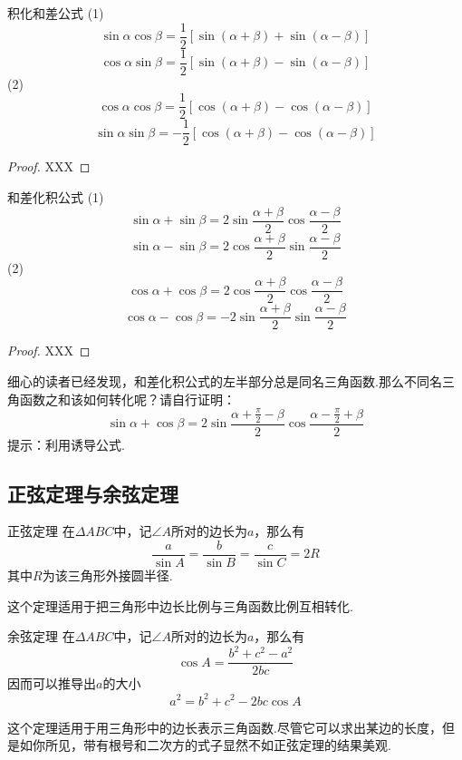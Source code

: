 \documentclass[lang=cn, zihao=5]{elegantbook}
\begin{document}
\begin{proposition}{积化和差公式} %
    (1)$$\sin{\alpha}\cos{\beta}=\frac{1}{2}[\sin{(\alpha+\beta)}+\sin{(\alpha-\beta)}]$$
    $$\cos{\alpha}\sin{\beta}=\frac{1}{2}[\sin{(\alpha+\beta)}-\sin{(\alpha-\beta)}]$$
    (2)$$\cos{\alpha}\cos{\beta}=\frac{1}{2}[\cos{(\alpha+\beta)}-\cos{(\alpha-\beta)}]$$
    $$\sin{\alpha}\sin{\beta}=-\frac{1}{2}[\cos{(\alpha+\beta)}-\cos{(\alpha-\beta)}]$$
\end{proposition}
\begin{proof}
    XXX
\end{proof}

\begin{proposition}{和差化积公式} %
    (1)$$\sin{\alpha}+\sin{\beta}=2\sin{\frac{\alpha+\beta}{2}}\cos{\frac{\alpha-\beta}{2}}$$
    $$\sin{\alpha}-\sin{\beta}=2\cos{\frac{\alpha+\beta}{2}}\sin{\frac{\alpha-\beta}{2}}$$
    (2)$$\cos{\alpha}+\cos{\beta}=2\cos{\frac{\alpha+\beta}{2}}\cos{\frac{\alpha-\beta}{2}}$$
    $$\cos{\alpha}-\cos{\beta}=-2\sin{\frac{\alpha+\beta}{2}}\sin{\frac{\alpha-\beta}{2}}$$
\end{proposition}
\begin{proof}
    XXX
\end{proof}
\begin{remark}
    细心的读者已经发现，和差化积公式的左半部分总是同名三角函数.那么不同名三角函数之和该如何转化呢？请自行证明：$$\sin{\alpha}+\cos{\beta}=2\sin{\frac{\alpha+\frac{\pi}{2}-\beta}{2}}\cos{\frac{\alpha-\frac{\pi}{2}+\beta}{2}}$$
    提示：利用诱导公式.
\end{remark}

\subsection{正弦定理与余弦定理}

\begin{theorem}{正弦定理} %
    在$\Delta ABC$中，记$\angle A$所对的边长为$a$，那么有$$\frac{a}{\sin{A}}=\frac{b}{\sin{B}}=\frac{c}{\sin{C}}=2R$$其中$R$为该三角形外接圆半径.
\end{theorem}
这个定理适用于把三角形中边长比例与三角函数比例互相转化.

\begin{theorem}{余弦定理} %
    在$\Delta ABC$中，记$\angle A$所对的边长为$a$，那么有$$\cos{A}=\frac{b^2+c^2-a^2}{2bc}$$
    因而可以推导出$a$的大小$$a^2=b^2+c^2-2bc \cos{A}$$
\end{theorem}
这个定理适用于用三角形中的边长表示三角函数.尽管它可以求出某边的长度，但是如你所见，带有根号和二次方的式子显然不如正弦定理的结果美观.
\end{document}
